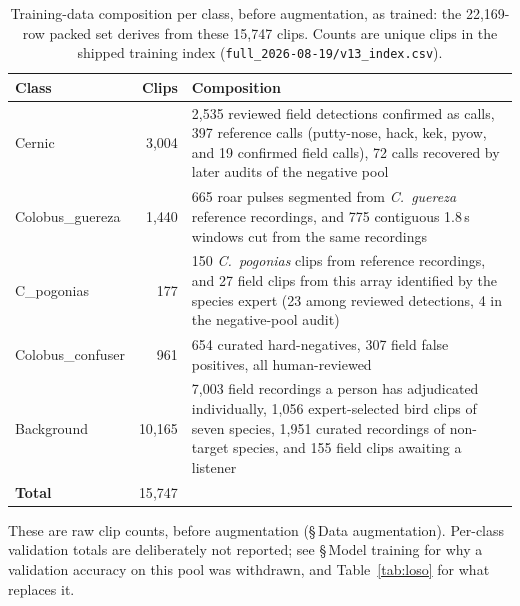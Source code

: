 \documentclass[review,3p,times]{elsarticle}
\begin{document}
\begin{table}[H]
\centering
\caption{Training-data composition per class, before augmentation, as trained:
the 22{,}169-row packed set derives from these 15{,}747 clips. Counts are
unique clips in the shipped training index
(\texttt{full\_2026-08-19/v13\_index.csv}).}
\label{tab:traindata}
\begin{tabularx}{\linewidth}{lrX}
\toprule
Class & Clips & Composition \\
\midrule
Cernic            & 3{,}004      & 2{,}535 reviewed field detections confirmed
                                   as calls, 397 reference calls (putty-nose,
                                   hack, kek, pyow, and 19 confirmed field
                                   calls), 72 calls recovered by
                                   later audits of the negative pool \\
Colobus\_guereza  & 1{,}440      & 665 roar pulses segmented from
                                   \textit{C.\ guereza} reference recordings,
                                   and 775 contiguous 1.8\,s windows cut from
                                   the same recordings \\
C\_pogonias       & 177          & 150 \textit{C.\ pogonias} clips from
                                   reference recordings, and 27 field clips
                                   from this array identified by the species
                                   expert (23 among reviewed detections, 4 in
                                   the negative-pool audit) \\
Colobus\_confuser & 961          & 654 curated hard-negatives, 307
                                   field false positives, all human-reviewed \\
Background        & 10{,}165     & 7{,}003 field recordings a person has
                                   adjudicated individually, 1{,}056
                                   expert-selected bird clips of seven species,
                                   1{,}951 curated recordings of non-target
                                   species, and 155 field clips awaiting a
                                   listener \\
\midrule
\textbf{Total}    & 15{,}747     & \\
\bottomrule
\end{tabularx}
\end{table}

\noindent These are raw clip counts, before augmentation
(\S\,Data augmentation). Per-class validation totals are deliberately not
reported; see \S\,Model training for why a validation accuracy on this pool was
withdrawn, and Table~\ref{tab:loso} for what replaces it.
\end{document}
